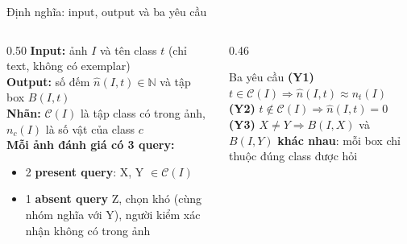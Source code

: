 \documentclass[aspectratio=169,10pt]{beamer}
\begin{document}
\begin{frame}{Định nghĩa: input, output và ba yêu cầu}
\begin{columns}[T]
\begin{column}{0.50\textwidth}
\textbf{Input:} ảnh $I$ và tên class $t$ (chỉ text, không có exemplar)\\[1mm]
\textbf{Output:} số đếm $\hat n(I,t)\in\mathbb{N}$ và tập box $B(I,t)$\\[1mm]
\textbf{Nhãn:} $\mathcal{C}(I)$ là tập class có trong ảnh, $n_c(I)$ là số vật của class $c$\\[2mm]
\textbf{Mỗi ảnh đánh giá có 3 query:}
\begin{itemize}\small
\item 2 \textbf{present query}: X, Y $\in\mathcal{C}(I)$
\item 1 \textbf{absent query} Z, chọn khó (cùng nhóm nghĩa với Y), người kiểm xác nhận không có trong ảnh
\end{itemize}
\end{column}
\begin{column}{0.46\textwidth}
\begin{block}{Ba yêu cầu}
\small
\textbf{(Y1)} $t\in\mathcal{C}(I)\Rightarrow \hat n(I,t)\approx n_t(I)$\\[1.5mm]
\textbf{(Y2)} $t\notin\mathcal{C}(I)\Rightarrow \hat n(I,t)=0$\\[1.5mm]
\textbf{(Y3)} $X\neq Y \Rightarrow B(I,X)$ và $B(I,Y)$ \textbf{khác nhau}: mỗi box chỉ thuộc đúng class được hỏi
\end{block}
\end{column}
\end{columns}
\end{frame}
\end{document}
